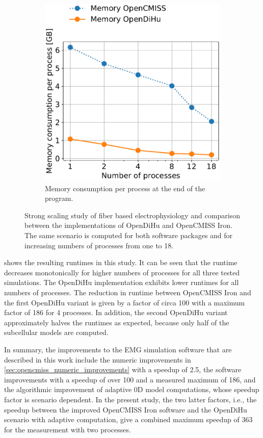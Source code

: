 \begin{figure}[H]
\begin{subfigure}[t]{0.47\textwidth}
    \includegraphics[width=\textwidth]{images/results/studies/0_strong_scaling_memory.pdf}%
    \caption{Memory consumption per process at the end of the program.}%
    \label{fig:0_strong_scaling_memory}%
  \end{subfigure}   
  \caption{Strong scaling study of fiber based electrophysiology and comparison between the implementations of OpenDiHu and OpenCMISS Iron. The same scenario is computed for both software packages and for increasing numbers of processes from one to 18.}%
  \label{fig:0_strong_scaling}%
\end{figure}%

 shows the resulting runtimes in this study. It can be seen that the runtime decreases monotonically for higher numbers of processes for all three tested simulations. The OpenDiHu implementation exhibits lower runtimes for all numbers of processes. The reduction in runtime between OpenCMISS Iron and the first OpenDiHu variant is given by a factor of circa 100 with a maximum factor of 186 for 4 processes. In addition, the second OpenDiHu variant approximately halves the runtimes as expected, because only half of the subcellular models are computed.

In summary, the improvements to the EMG simulation software that are described in this work include the numeric improvements in \cref{sec:opencmiss_numeric_improvements} with a speedup of 2.5, the software improvements with a speedup of over 100 and a measured maximum of 186, and the algorithmic improvement of adaptive 0D model computations, whose speedup factor is scenario dependent. In the present study, the two latter factors, i.e., the speedup between the improved OpenCMISS Iron software and the OpenDiHu scenario with adaptive computation, give a combined maximum speedup of 363 for the measurement with two processes.


